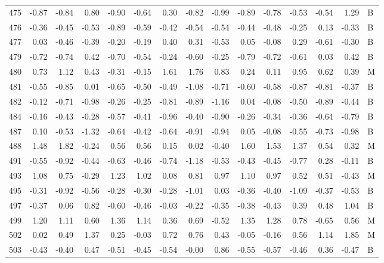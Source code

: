 \begin{table}[ht]
\begin{tabular}{rrrrrrrrrrrrrrl}
  475 & -0.87 & -0.84 & 0.80 & -0.90 & -0.64 & 0.30 & -0.82 & -0.99 & -0.89 & -0.78 & -0.53 & -0.54 & 1.29 & B \\ 
  476 & -0.36 & -0.45 & -0.53 & -0.89 & -0.59 & -0.42 & -0.54 & -0.54 & -0.44 & -0.48 & -0.25 & 0.13 & -0.33 & B \\ 
  477 & 0.03 & -0.46 & -0.39 & -0.20 & -0.19 & 0.40 & 0.31 & -0.53 & 0.05 & -0.08 & 0.29 & -0.61 & -0.30 & B \\ 
  479 & -0.72 & -0.74 & 0.42 & -0.70 & -0.54 & -0.24 & -0.60 & -0.25 & -0.79 & -0.72 & -0.61 & 0.03 & 0.42 & B \\ 
  480 & 0.73 & 1.12 & 0.43 & -0.31 & -0.15 & 1.61 & 1.76 & 0.83 & 0.24 & 0.11 & 0.95 & 0.62 & 0.39 & M \\ 
  481 & -0.55 & -0.85 & 0.01 & -0.65 & -0.50 & -0.49 & -1.08 & -0.71 & -0.60 & -0.58 & -0.87 & -0.81 & -0.37 & B \\ 
  482 & -0.12 & -0.71 & -0.98 & -0.26 & -0.25 & -0.81 & -0.89 & -1.16 & 0.04 & -0.08 & -0.50 & -0.89 & -0.44 & B \\ 
  484 & -0.16 & -0.43 & -0.28 & -0.57 & -0.41 & -0.96 & -0.40 & -0.90 & -0.26 & -0.34 & -0.36 & -0.64 & -0.79 & B \\ 
  487 & 0.10 & -0.53 & -1.32 & -0.64 & -0.42 & -0.64 & -0.91 & -0.94 & 0.05 & -0.08 & -0.55 & -0.73 & -0.98 & B \\ 
  488 & 1.48 & 1.82 & -0.24 & 0.56 & 0.56 & 0.15 & 0.02 & -0.40 & 1.60 & 1.53 & 1.37 & 0.54 & 0.32 & M \\ 
  491 & -0.55 & -0.92 & -0.44 & -0.63 & -0.46 & -0.74 & -1.18 & -0.53 & -0.43 & -0.45 & -0.77 & 0.28 & -0.11 & B \\ 
  493 & 1.08 & 0.75 & -0.29 & 1.23 & 1.02 & 0.08 & 0.81 & 0.97 & 1.10 & 0.97 & 0.52 & 0.51 & -0.43 & M \\ 
  495 & -0.31 & -0.92 & -0.56 & -0.28 & -0.30 & -0.28 & -1.01 & 0.03 & -0.36 & -0.40 & -1.09 & -0.37 & -0.53 & B \\ 
  497 & -0.37 & 0.06 & 0.82 & -0.60 & -0.46 & -0.03 & -0.22 & -0.35 & -0.38 & -0.43 & 0.39 & 0.48 & 1.04 & B \\ 
  499 & 1.20 & 1.11 & 0.60 & 1.36 & 1.14 & 0.36 & 0.69 & -0.52 & 1.35 & 1.28 & 0.78 & -0.65 & 0.56 & M \\ 
  502 & 0.02 & 0.49 & 1.37 & 0.25 & -0.03 & 0.72 & 0.76 & 0.43 & -0.05 & -0.16 & 0.56 & 1.14 & 1.85 & M \\ 
  503 & -0.43 & -0.40 & 0.47 & -0.51 & -0.45 & -0.54 & -0.00 & 0.86 & -0.55 & -0.57 & -0.46 & 0.36 & -0.47 & B \\ 

\end{tabular}
\end{table}
